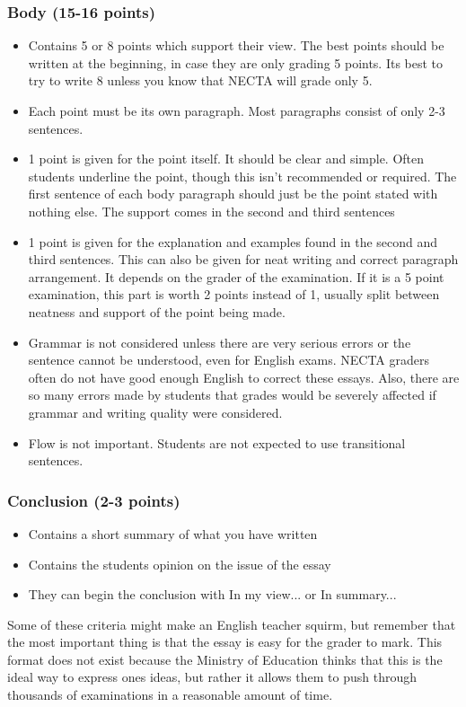 \subsubsection{Body (15-16 points)}
\begin{itemize}
\item Contains 5 or 8 points which support their view.  The best points should be written at the beginning, in case they are only grading 5 points.  Its best to try to write 8 unless you know that NECTA will grade only 5.
\item Each point must be its own paragraph.  Most paragraphs consist of only 2-3 sentences.
\item 1 point is given for the point itself.  It should be clear and simple.  Often students underline the point, though this isn't recommended or required.  The first sentence of each body paragraph should just be the point stated with nothing else.  The support comes in the second and third sentences
\item 1 point is given for the explanation and examples found in the second and third sentences.  This can also be given for neat writing and correct paragraph arrangement.  It depends on the grader of the examination.  If it is a 5 point examination, this part is worth 2 points instead of 1, usually split between neatness and support of the point being made.
\item Grammar is not considered unless there are very serious errors or the sentence cannot be understood, even for English exams.  NECTA graders often do not have good enough English to correct these essays.  Also, there are so many errors made by students that grades would be severely affected if grammar and writing quality were considered.
\item Flow is not important.  Students are not expected to use transitional sentences.
\end{itemize}

 
\subsubsection{Conclusion (2-3 points)}
\begin{itemize}
\item Contains a short summary of what you have written
\item Contains the students opinion on the issue of the essay
\item They can begin the conclusion with In my view... or In summary...
\end{itemize}

 Some of these criteria might make an English teacher squirm, but remember that the most important thing is that the essay is easy for the grader to mark.  This format does not exist because the Ministry of Education thinks that this is the ideal way to express ones ideas, but rather it allows them to push through thousands of examinations in a reasonable amount of time.